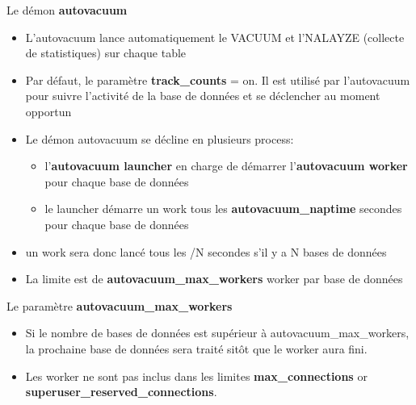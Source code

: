
\begin{frame}{Le démon \textbf{autovacuum}}

\begin{itemize}
   \item L'autovacuum lance automatiquement le VACUUM et l'NALAYZE (collecte de statistiques) sur chaque table
   \item Par défaut, le paramètre \textbf{track\_counts} = on. Il est utilisé par l'autovacuum pour suivre l'activité de la base de données et se déclencher au moment opportun
   \item Le démon autovacuum se décline en plusieurs process:
   \begin{itemize}
      \item l'\textbf{autovacuum launcher} en charge de démarrer l'\textbf{autovacuum worker} pour chaque base de données
      \item le launcher démarre un work tous les \textbf{autovacuum\_naptime} secondes pour chaque base de données
   \end{itemize}
   \item un work sera donc lancé tous les /N secondes s'il y a N bases de données
   \item La limite est de \textbf{autovacuum\_max\_workers} worker par base de données

\end{itemize}

\end{frame}


\begin{frame}{Le paramètre \textbf{autovacuum\_max\_workers}}

\begin{itemize}
   \item Si le nombre de bases de données est supérieur à autovacuum\_max\_workers, la prochaine base de données sera traité sitôt que le worker aura fini.
   \item Les worker ne sont pas inclus dans les limites \textbf{max\_connections} or \textbf{superuser\_reserved\_connections}.

\end{itemize}

\begin{toile}
\end{toile}

\end{frame}


